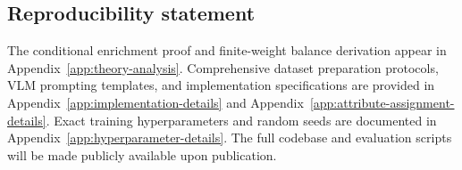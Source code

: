 \documentclass[10pt,twocolumn,letterpaper]{article}
\begin{document}
\subsection*{Reproducibility statement}

The conditional enrichment proof and finite-weight balance derivation appear in Appendix~\ref{app:theory-analysis}. Comprehensive dataset preparation protocols, VLM prompting templates, and implementation specifications are provided in Appendix~\ref{app:implementation-details} and Appendix~\ref{app:attribute-assignment-details}. Exact training hyperparameters and random seeds are documented in Appendix~\ref{app:hyperparameter-details}. The full codebase and evaluation scripts will be made publicly available upon publication.





\clearpage
\appendix
\maketitlesupplementary

\begin{tcolorbox}[
    colback=gray!2!white,
    colframe=gray!20!white,
    arc=4pt,
    boxrule=0.5pt,
    left=12pt, right=12pt, top=10pt, bottom=10pt,
    title=\textbf{Appendix Outline},
    coltitle=black,
    fonttitle=\bfseries\large,
    colbacktitle=gray!10!white,
    rounded corners,
    drop shadow
]
\startcontents[appendix]
\end{tcolorbox}
\clearpage


\FloatBarrier

\FloatBarrier

\FloatBarrier

\FloatBarrier

\FloatBarrier

\FloatBarrier

\FloatBarrier

\FloatBarrier

\FloatBarrier

\FloatBarrier

\FloatBarrier

\FloatBarrier

\FloatBarrier

\FloatBarrier

\FloatBarrier
%

\FloatBarrier
\end{document}
